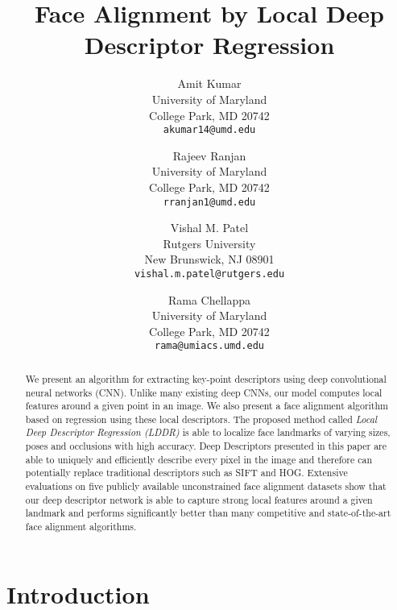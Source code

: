 \documentclass[10pt,twocolumn,letterpaper]{article}
\begin{document}
\title{Face Alignment by Local Deep Descriptor Regression}


\author{Amit Kumar\\
University of Maryland\\
College Park, MD 20742\\
{\tt\small akumar14@umd.edu}
\and
Rajeev Ranjan\\
University of Maryland\\
College Park, MD 20742\\
{\tt\small rranjan1@umd.edu}
\and
Vishal M. Patel\\
Rutgers University\\
New Brunswick, NJ 08901\\
{\tt\small vishal.m.patel@rutgers.edu}
\and
Rama Chellappa\\
University of Maryland\\
College Park, MD 20742\\
{\tt\small rama@umiacs.umd.edu}
}

\maketitle

\begin{abstract}
   We present an algorithm for extracting key-point descriptors using deep convolutional neural networks (CNN). Unlike many existing deep CNNs, our model computes local features around a given point in an image. We also present a face alignment algorithm based on regression using these local descriptors. The proposed method called \textit{Local Deep Descriptor Regression (LDDR)} is able to localize face landmarks of varying sizes, poses and occlusions with high accuracy. Deep Descriptors presented in this paper are able to uniquely and efficiently describe every pixel in the image and therefore can potentially replace traditional descriptors such as SIFT and HOG. Extensive evaluations on five publicly available unconstrained face alignment datasets show that our deep descriptor network is able to capture strong local features around a given landmark and performs significantly better than many competitive and state-of-the-art face alignment algorithms.
\end{abstract}

\section{Introduction}
\end{document}
